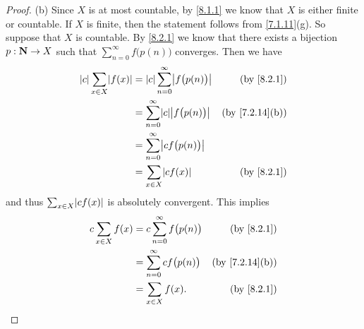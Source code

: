 \begin{proof}{(b)}
  Since \(X\) is at most countable, by \cref{8.1.1} we know that \(X\) is either finite or countable.
  If \(X\) is finite, then the statement follows from \cref{7.1.11}(g).
  So suppose that \(X\) is countable.
  By \cref{8.2.1} we know that there exists a bijection \(p : \mathbf{N} \to X\) such that \(\sum_{n = 0}^\infty f\big(p(n)\big)\) converges.
  Then we have
  \begin{align*}
    \abs{c} \sum_{x \in X} \abs{f(x)} & = \abs{c} \sum_{n = 0}^\infty \abs{f\big(p(n)\big)} & \text{(by \cref{8.2.1})}     \\
                                      & = \sum_{n = 0}^\infty \abs{c} \abs{f\big(p(n)\big)} & \text{(by \cref{7.2.14}(b))} \\
                                      & = \sum_{n = 0}^\infty \abs{c f\big(p(n)\big)}                                      \\
                                      & = \sum_{x \in X} \abs{c f(x)}                       & \text{(by \cref{8.2.1})}
  \end{align*}
  and thus \(\sum_{x \in X} \abs{c f(x)}\) is absolutely convergent.
  This implies
  \begin{align*}
    c \sum_{x \in X} f(x) & = c \sum_{n = 0}^\infty f\big(p(n)\big) & \text{(by \cref{8.2.1})}     \\
                          & = \sum_{n = 0}^\infty c f\big(p(n)\big) & \text{(by \cref{7.2.14}(b))} \\
                          & = \sum_{x \in X} f(x).                  & \text{(by \cref{8.2.1})}
  \end{align*}
\end{proof}

